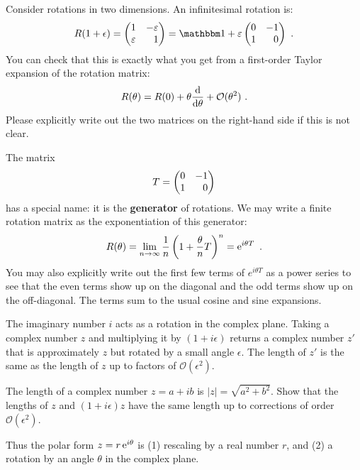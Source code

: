 \documentclass[12pt, oneside]{report}    %
\begin{document}
\begin{example} Consider rotations in two dimensions. An infinitesimal rotation is:
\begin{align}
    R(1+\epsilon) = 
    \begin{pmatrix}
        1 & -\varepsilon \\
        \varepsilon & \pp 1
    \end{pmatrix}
    = 
    \one + \varepsilon 
    \begin{pmatrix}
        0 & - 1 \\
        1 & \pp 0
    \end{pmatrix} \ .
\end{align}
You can check that this is exactly what you get from a first-order Taylor expansion of the rotation matrix:
\begin{align}
    R(\theta) = 
    R(0)
    + \theta 
    \frac{\operatorname{d}\!{}}{\operatorname{d}\!{\theta}}  + \mathcal O(\theta^2) \ .
\end{align}
Please explicitly write out the two matrices on the right-hand side if this is not clear. 

The matrix 
\begin{align}
    T =\begin{pmatrix}
        0 & - 1 \\
        1 & \pp 0
    \end{pmatrix} 
\end{align}
has a special name: it is the \textbf{generator} of rotations. We may write a finite rotation matrix as the exponentiation of this generator:
\begin{align}
    R(\theta)  = 
    \lim_{n\to\infty} \frac{1}{n}
    \left(1+\frac{\theta}{n} T\right)^n
    = 
    \operatorname{e}^{i\theta T} \ .
\end{align}
You may also explicitly write out the first few terms of $e^{i\theta T}$ as a power series to see that the even terms show up on the diagonal and the odd terms show up on the off-diagonal. The terms sum to the usual cosine and sine expansions.
\end{example}

The imaginary number $i$ acts as a rotation in the complex plane. Taking a complex number $z$ and multiplying it by $(1+i\epsilon )$ returns a complex number $z'$ that is approximately $z$ but rotated by a small angle $\epsilon$. The length of $z'$ is the same as the length of $z$ up to factors of $\mathcal O(\epsilon^2)$.
\begin{exercise}
The length of a complex number $z=a+ib$ is $|z| = \sqrt{a^2 + b^2}$. Show that the lengths of $z$ and $(1+i \epsilon )z$ have the same length up to corrections of order $\mathcal O(\epsilon^2)$.
\end{exercise}
Thus the polar form $z=r\operatorname{e}^{i\theta}$ is (1) rescaling by a real number $r$, and (2) a rotation by an angle $\theta$ in the complex plane. 
\end{document}
